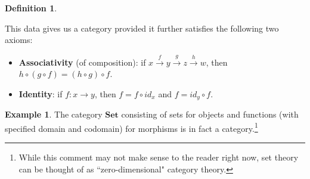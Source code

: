 \documentclass[a4paper]{book}
\theoremstyle{definition}
\newtheorem{example}{Example}[section]
\theoremstyle{definition}
\newtheorem{definition}{Definition}[section]
\theoremstyle{definition}
\theoremstyle{theorem}
\theoremstyle{definition}
\begin{document}
\begin{definition}
\begin{itemize}
	\end{itemize}
	This data gives us a category provided it further satisfies the following two axioms:  
	\begin{itemize}
		\item \textbf{Associativity} (of composition): if $x \xrightarrow{f} y \xrightarrow{g} z \xrightarrow{h} w$, then $h \circ (g \circ f) = (h \circ g) \circ f$. 
		\begin{center}
		\end{center}
		\item \textbf{Identity}: if $f: x \rightarrow y$, then $f = f \circ id_x$ and $f = id_y \circ f$. 
	\end{itemize} 
\end{definition} 
\begin{example}
	The category $\textbf{Set}$ consisting of sets for objects and functions (with specified domain and codomain) for morphisms is in fact a category.\footnote{While this comment may not make sense to the reader right now, set theory can be thought of as ``zero-dimensional" category theory.}    
\end{example}
\end{document}
